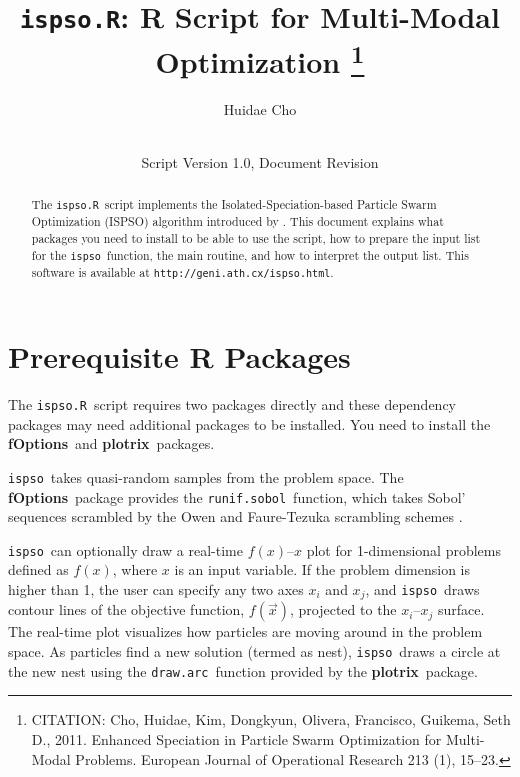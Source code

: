 \documentclass{article}
\def\ispsoR{\texttt{ispso.R}}
\def\ispso{\texttt{ispso}}
\def\fOptions{\textbf{fOptions}}
\def\plotrix{\textbf{plotrix}}
\def\runifsobol{\texttt{runif.sobol}}
\def\drawarc{\texttt{draw.arc}}
\begin{document}
\title{\ispsoR: R Script for Multi-Modal Optimization%
\footnote{CITATION: Cho, Huidae, Kim, Dongkyun, Olivera, Francisco, Guikema, Seth D., 2011.  Enhanced Speciation in Particle Swarm Optimization for Multi-Modal Problems.  European Journal of Operational Research 213 (1), 15--23.}}
\author{Huidae Cho}
\date{\RCSDate\\Script Version 1.0, Document Revision \RCSRevision}
\maketitle

\begin{abstract}
  The \ispsoR\ script implements the Isolated-Speciation-based Particle Swarm Optimization (ISPSO) algorithm introduced by \cite{Cho.ea.2011}.
  This document explains what packages you need to install to be able to use the script, how to prepare the input list for the \ispso\ function, the main routine, and how to interpret the output list.
  This software is available at \texttt{http://geni.ath.cx/ispso.html}.
\end{abstract}

\tableofcontents

\section{Prerequisite R Packages}

The \ispsoR\ script requires two packages directly and these dependency packages may need additional packages to be installed.
You need to install the \fOptions\ and \plotrix\ packages.

\ispso\ takes quasi-random samples from the problem space.
The \fOptions\ package provides the \runifsobol\ function, which takes Sobol' sequences \citep{Sobol'.1967} scrambled by the Owen and Faure-Tezuka scrambling schemes \citep{Owen.1998, Faure.Tezuka.2002}.

\ispso\ can optionally draw a real-time $f(x)$--$x$ plot for 1-dimensional problems defined as $f(x)$, where $x$ is an input variable.
If the problem dimension is higher than 1, the user can specify any two axes $x_i$ and $x_j$, and \ispso\ draws contour lines of the objective function, $f(\vec{x})$, projected to the $x_i$--$x_j$ surface.
The real-time plot visualizes how particles are moving around in the problem space.
As particles find a new solution (termed as nest), \ispso\ draws a circle at the new nest using the \drawarc\ function provided by the \plotrix\ package.
\end{document}
